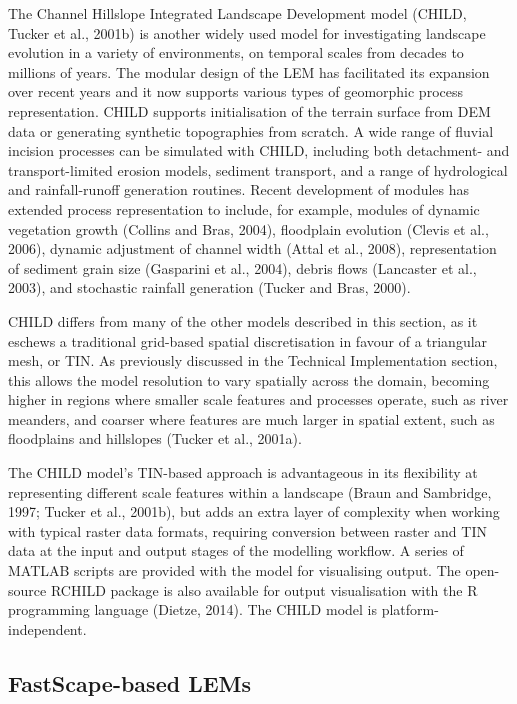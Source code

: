The Channel Hillslope Integrated Landscape Development model (CHILD, Tucker et al., 2001b) is another widely used model for investigating landscape evolution in a variety of environments, on temporal scales from decades to millions of years. The modular design of the LEM has facilitated its expansion over recent years and it now supports various types of geomorphic process representation. CHILD supports initialisation of the terrain surface from DEM data or generating synthetic topographies from scratch. A wide range of fluvial incision processes can be simulated with CHILD, including both detachment- and transport-limited erosion models, sediment transport, and a range of hydrological and rainfall-runoff generation routines. Recent development of modules has extended process representation to include, for example, modules of dynamic vegetation growth (Collins and Bras, 2004), floodplain evolution (Clevis et al., 2006), dynamic adjustment of channel width (Attal et al., 2008), representation of sediment grain size (Gasparini et al., 2004), debris flows (Lancaster et al., 2003), and stochastic rainfall generation (Tucker and Bras, 2000).

CHILD differs from many of the other models described in this section, as it eschews a traditional grid-based spatial discretisation in favour of a triangular mesh, or TIN. As previously discussed in the Technical Implementation section, this allows the model resolution to vary spatially across the domain, becoming higher in regions where smaller scale features and processes operate, such as river meanders, and coarser where features are much larger in spatial extent, such as floodplains and hillslopes (Tucker et al., 2001a). 

The CHILD model’s TIN-based approach is advantageous in its flexibility at representing different scale features within a landscape (Braun and Sambridge, 1997; Tucker et al., 2001b), but adds an extra layer of complexity when working with typical raster data formats, requiring conversion between raster and TIN data at the input and output stages of the modelling workflow. A series of MATLAB scripts are provided with the model for visualising output. The open-source RCHILD package is also available for output visualisation with the R programming language (Dietze, 2014). The CHILD model is platform-independent.

\subsection{FastScape-based LEMs}

